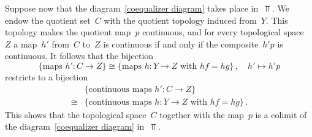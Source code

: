 Suppose now that the diagram~\eqref{coequalizer diagram} takes place in~$\Top$.
We endow the quotient set~$C$ with the quotient topology induced from~$Y$.
This topology makes the quotient map~$p$ continuous, and for every topological space~$Z$ a map~$h'$ from~$C$ to~$Z$ is continuous if and only if the composite~$h' p$ is continuous.
It follows that the bijection
\[
	\{ \text{maps~$\textstyle h' \colon C \to Z$} \}
	≅
	\{ \text{maps~$\textstyle h \colon Y \to Z$ with~$h f = h g$} \} \,,
	\quad
	h' \mapsto h' p
\]
restricts to a bijection
\begin{align*}
	{}&
	\{ \textstyle \text{continuous maps~$h' \colon C \to Z$} \} \\
	≅{}&
	\{ \textstyle \text{continuous maps~$h \colon Y \to Z$ with~$h f = h g$} \} \,.
\end{align*}
This shows that the topological space~$C$ together with the map~$p$ is a colimit of the diagram~\eqref{coequalizer diagram} in~$\Top$.
